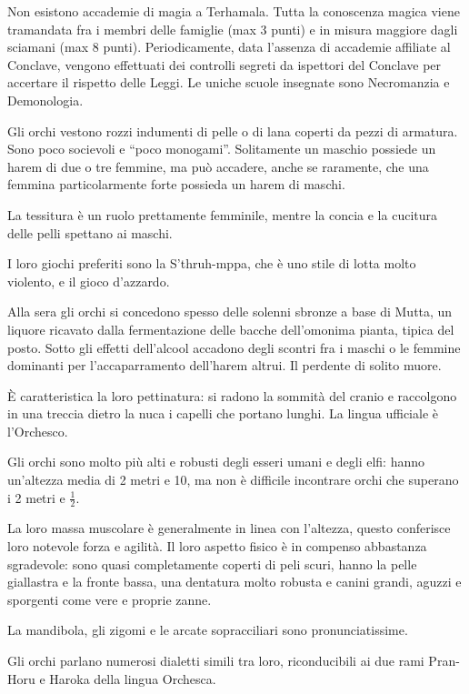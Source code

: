 \Magia Non esistono accademie di magia a Terhamala.
Tutta la conoscenza magica viene tramandata fra i membri delle
famiglie (max 3 punti) e in misura maggiore dagli sciamani (max 8
punti). Periodicamente, data l'assenza di accademie affiliate al
Conclave, vengono effettuati dei controlli segreti da ispettori del
Conclave per accertare il rispetto delle Leggi. Le uniche scuole
insegnate sono Necromanzia e Demonologia. 

\Moda Gli orchi vestono rozzi indumenti di pelle o di lana coperti da pezzi
di armatura. Sono poco socievoli e ``poco monogami''.  Solitamente un
maschio possiede un harem di due o tre femmine, ma pu\`o accadere,
anche se raramente, che una femmina particolarmente forte possieda un
harem di maschi. 

 La tessitura \`e un
ruolo prettamente femminile, mentre la concia e la cucitura delle
pelli spettano ai maschi.

I loro giochi preferiti sono la S'thruh-mppa, che \`e uno stile di lotta
molto violento, e il gioco d'azzardo.


Alla sera gli orchi si concedono spesso delle solenni sbronze a base
di Mutta, un liquore ricavato dalla fermentazione delle bacche
dell'omonima pianta, tipica del posto.  Sotto gli effetti dell'alcool
accadono degli scontri fra i maschi o le femmine dominanti per
l'accaparramento dell'harem altrui.  Il perdente di solito muore.

\`E caratteristica la loro pettinatura: si radono la sommit\`a del
cranio e raccolgono in una treccia dietro la nuca i capelli che
portano lunghi. La lingua ufficiale \`e l'Orchesco.

\Fisico Gli orchi sono molto pi\`u alti e robusti degli esseri umani e degli
elfi: hanno un'altezza media di 2 metri e 10, ma non \`e difficile
incontrare orchi che superano i 2 metri e $\frac{1}{2}$.

La loro massa muscolare \`e generalmente in linea con l'altezza,
questo conferisce loro notevole forza e agilit\`a.  Il loro aspetto
fisico \`e in compenso abbastanza sgradevole: sono quasi
completamente coperti di peli scuri, hanno la pelle giallastra e la
fronte bassa, una dentatura molto robusta e canini grandi, aguzzi e sporgenti
come vere e proprie zanne.

La  mandibola, gli zigomi e le arcate sopracciliari sono
pronunciatissime.

Gli orchi parlano numerosi dialetti simili tra loro, 
riconducibili ai due rami Pran-Horu e Haroka della lingua Orchesca.

